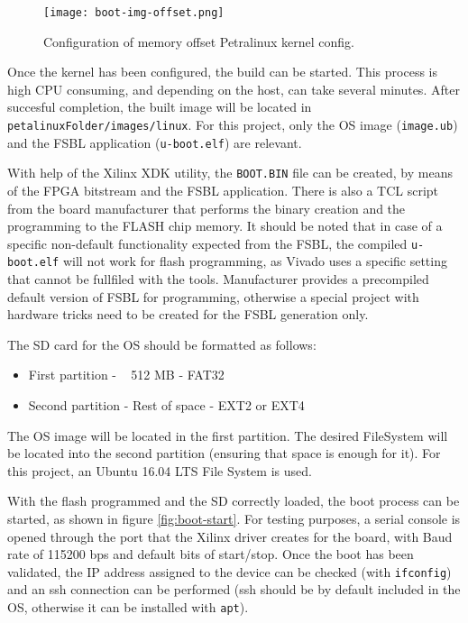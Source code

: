 \begin{figure}[htp]
	\centering
	\texttt{[image: boot-img-offset.png]}
	\caption{Configuration of memory offset Petralinux kernel config.}
	\label{fig:boot-img-source-offset}
\end{figure}

Once the kernel has been configured, the build can be started. This process is high CPU consuming,
and depending on the host, can take several minutes. After succesful completion, the built image
will be located in \texttt{petalinuxFolder/images/linux}. For this project, only the OS image
(\texttt{image.ub}) and the FSBL application (\texttt{u-boot.elf}) are relevant.

With help of the Xilinx XDK utility, the \texttt{BOOT.BIN} file can be created, by means of the
FPGA bitstream and the FSBL application. There is also a TCL script from the board manufacturer that
performs the binary creation and the programming to the FLASH chip memory. It should be noted that
in case of a specific non-default functionality expected from the FSBL, the compiled
\texttt{u-boot.elf} will not work for flash programming, as Vivado uses a specific setting that
cannot be fullfiled with the tools. Manufacturer provides a precompiled default version of FSBL for
programming, otherwise a special project with hardware tricks need to be created for the FSBL
generation only.

The SD card for the OS should be formatted as follows:

\begin{itemize}
	\item First partition - ~ 512 MB - FAT32
	\item Second partition - Rest of space - EXT2 or EXT4
\end{itemize}

The OS image will be located in the first partition. The desired FileSystem will be located into the
second partition (ensuring that space is enough for it). For this project, an Ubuntu 16.04 LTS
File System is used.

With the flash programmed and the SD correctly loaded, the boot process can be started, as shown in
figure \ref{fig:boot-start}. For testing purposes, a serial console is opened through the port
that the Xilinx driver creates for the board, with Baud rate of 115200 bps and default bits of
start/stop. Once the boot has been validated, the IP address assigned to the device can be checked
(with \texttt{ifconfig}) and an ssh connection can be performed (ssh should be by default included
in the OS, otherwise it can be installed with \texttt{apt}).


